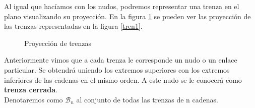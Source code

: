 \documentclass[14pt]{extarticle}
\begin{document}
Al igual que hacíamos con los nudos, podremos representar una trenza en el plano visualizando su proyección. En la figura \ref{tren2} se pueden ver las proyección de las trenzas representadas en la figura \ref{tren1}.\\
   \begin{figure}[h!]
   	\centering
   	\space
   	\caption{Proyección de trenzas}
   	\label{tren2} 
   \end{figure}  

Anteriormente vimos que a cada trenza le corresponde un nudo o un enlace particular. Se obtendrá uniendo los extremos superiores con los extremos inferiores de las cadenas en el mismo orden. A este nudo se le conocerá como \textbf{trenza cerrada}. \\

Denotaremos como $\mathscr{B}_{n}$ al conjunto de todas las trenzas de n cadenas.\\
\end{document}

